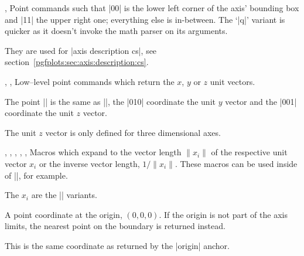 \begin{commandlist}{%
	\pgfplotspointdescriptionxy{},%
	\pgfplotsqpointdescriptionxy{}}%
	Point commands such that |{0}{0}| is the lower left corner of the axis' bounding box and |{1}{1}| the upper right one; everything else is in-between. The `|q|' variant is quicker as it doesn't invoke the math parser on its arguments.

	They are used for |axis description cs|, see section~\ref{pgfplots:sec:axis:description:cs}.
\end{commandlist}

\begin{commandlist}{%
	\pgfplotspointunitx,%
	\pgfplotspointunity,%
	\pgfplotspointunitz}%
	Low--level point commands which return the $x$, $y$ or $z$ unit vectors.

	The point || is the same as |\pgfplotspointunitx|, the |{0}{1}{0}| coordinate the unit $y$ vector and the |{0}{0}{1}| coordinate the unit $z$ vector.

	The unit $z$ vector is only defined for three dimensional axes.
\end{commandlist}

\begin{commandlist}{%
	\pgfplotsunitxlength,%
	\pgfplotsunitylength,%
	\pgfplotsunitzlength,%
	\pgfplotsunitxinvlength,%
	\pgfplotsunityinvlength,%
	\pgfplotsunitzinvlength}%
	Macros which expand to the vector length $\lVert x_i \rVert$ of the respective unit vector $x_i$ or the inverse vector length, $1/\lVert x_i \rVert$. These macros can be used inside of |\pgfmathparse|, for example.

	The $x_i$ are the |\pgfplotspointunitx| variants.
\end{commandlist}

\begin{commandlist}{\pgfplotspointaxisorigin}
	A point coordinate at the origin, $(0,0,0)$. If the origin is not part of the axis limits, the nearest point on the boundary is returned instead.

	This is the same coordinate as returned by the |origin| anchor.
\end{commandlist}

